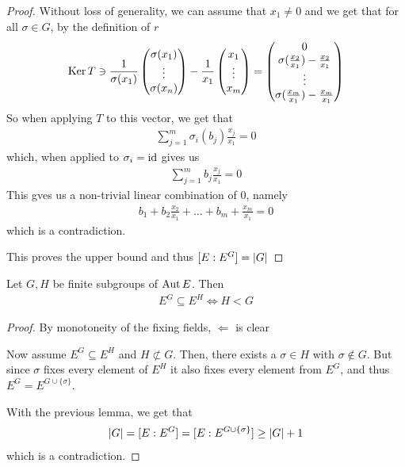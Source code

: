 \begin{proof}
  Without loss of generality, we can assume that $x_1 \neq 0$ and we get that for all $\sigma \in G$, by the definition of $r$
  \begin{align*}
    \operatorname{Ker} T \ni
    \frac{1}{\sigma(x_1)} \begin{pmatrix}
      \sigma(x_1)\\
    \vdots\\
    \sigma(x_n)
    \end{pmatrix}
     - \frac{1}{x_1} \begin{pmatrix}
     x_1\\
     \vdots\\
     x_m
     \end{pmatrix}
     =
     \begin{pmatrix}
     0\\
     \sigma(\frac{x_2}{x_1}) - \frac{x_2}{x_1}\\
     \vdots\\
     \sigma(\frac{x_m}{x_1}) - \frac{x_m}{x_1}
     \end{pmatrix}
  \end{align*}
  So when applying $T$ to this vector, we get that
  \begin{align*}
    \sum_{j=1}^{m} \sigma_i(b_j) \frac{x_j}{x_1} = 0
  \end{align*}
  which, when applied to $\sigma_i = \operatorname{id}$ gives us
  \begin{align*}
    \sum_{j=1}^{m} b_j \frac{x_j}{x_1} = 0
  \end{align*}
  This gves us a non-trivial linear combination of $0$, namely
  \begin{align*}
    b_1 + b_2 \frac{x_2}{x_1} + \ldots + b_m + \frac{x_m}{x_1} = 0
  \end{align*}
  which is a contradiction.

  This proves the upper bound and thus $[E: E^{G}] = \vert G\vert$
\end{proof}



\begin{cor}[]\label{cor:4-10}
  Let $G,H$ be finite subgroups of $\operatorname{Aut} E$. Then
  \begin{align*}
    E^{G} \subseteq E^{H} \iff H < G
  \end{align*}
\end{cor}
\begin{proof}
  By monotoneity of the fixing fields, $\Leftarrow$ is clear

  Now assume $E^{G} \subseteq E^{H}$ and $H \not\subset G$.
  Then, there exists a $\sigma \in H$ with $\sigma \notin G$.
  But since $\sigma$ fixes every element of $E^{H}$ it also fixes every element from $E^{G}$, and thus $E^{G} = E^{G \cup \{\sigma\}}$.

  With the previous lemma, we get that
  \begin{align*}
    \vert G\vert = [E:E^{G}] = [E : E^{G \cup \{\sigma\}}] \geq \vert G\vert + 1
  \end{align*}
  which is a contradiction.
\end{proof}
